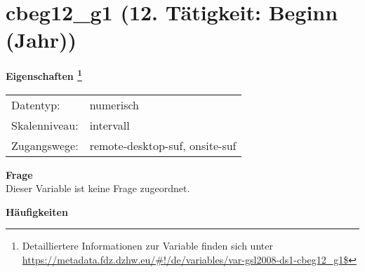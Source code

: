 
    \setcounter{footnote}{0}

    \vspace*{-1.8cm}
	\section{cbeg12\_g1 (12. Tätigkeit: Beginn (Jahr))}
	\label{section:cbeg12_g1}



    \vspace*{0.5cm}
    \noindent\textbf{Eigenschaften
	\footnote{Detailliertere Informationen zur Variable finden sich unter
		\url{https://metadata.fdz.dzhw.eu/\#!/de/variables/var-gsl2008-ds1-cbeg12_g1$}}}\\
	\begin{tabularx}{\hsize}{@{}lX}
	Datentyp: & numerisch \\
	Skalenniveau: & intervall \\
	Zugangswege: &
	  remote-desktop-suf, 
	  onsite-suf
 \\
    \end{tabularx}



		\vspace*{0.5cm}
		\noindent\textbf{Frage}\\
		Dieser Variable ist keine Frage zugeordnet.





        		\vspace*{0.5cm}
                \noindent\textbf{Häufigkeiten}

